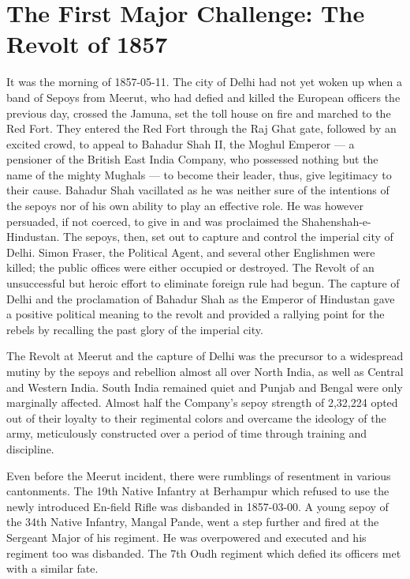 \chapter{The First Major Challenge: The Revolt of 1857}
\begin{multicols}{2}

It was the morning of 1857-05-11. The city of Delhi had not yet woken up when a band of Sepoys from Meerut, who had defied and killed the European officers the previous day, crossed the Jamuna, set the toll house on fire and marched to the Red Fort. They entered the Red Fort through the Raj Ghat gate, followed by an excited crowd, to appeal to Bahadur Shah II, the Moghul Emperor --- a pensioner of the British East India Company, who possessed nothing but the name of the mighty Mughals --- to become their leader, thus, give legitimacy to their cause. Bahadur Shah vacillated as he was neither sure of the intentions of the sepoys nor of his own ability to play an effective role. He was however persuaded, if not coerced, to give in and was proclaimed the Shahenshah-e-Hindustan. The sepoys, then, set out to capture and control the imperial city of Delhi. Simon Fraser, the Political Agent, and several other Englishmen were killed; the public offices were either occupied or destroyed. The Revolt of an unsuccessful but heroic effort to eliminate foreign rule had begun. The capture of Delhi and the proclamation of Bahadur Shah as the Emperor of Hindustan gave a positive political meaning to the revolt and provided a rallying point for the rebels by recalling the past glory of the imperial city.

The Revolt at Meerut and the capture of Delhi was the precursor to a widespread mutiny by the sepoys and rebellion almost all over North India, as well as Central and Western India. South India remained quiet and Punjab and Bengal were only marginally affected. Almost half the Company's sepoy strength of 2,32,224 opted out of their loyalty to their regimental colors and overcame the ideology of the army, meticulously constructed over a period of time through training and discipline.

Even before the Meerut incident, there were rumblings of resentment in various cantonments. The 19th Native Infantry at Berhampur which refused to use the newly introduced En-field Rifle was disbanded in 1857-03-00. A young sepoy of the 34th Native Infantry, Mangal Pande, went a step further and fired at the Sergeant Major of his regiment. He was overpowered and executed and his regiment too was disbanded. The 7th Oudh regiment which defied its officers met with a similar fate.


\end{multicols}
